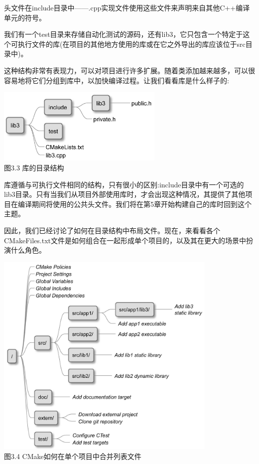 头文件在include目录中——.cpp实现文件使用这些文件来声明来自其他C++编译单元的符号。

我们有一个test目录来存储自动化测试的源码，还有lib3，它只包含一个特定于这个可执行文件的库(在项目的其他地方使用的库或在它之外导出的库应该位于src目录中)。

这种结构非常有表现力，可以对项目进行许多扩展。随着类添加越来越多，可以很容易地将它们分组到库中，以加快编译过程。让我们看看库是什么样子的:

\begin{center}
\includegraphics[width=0.6\textwidth]{content/1/chapter3/images/3.jpg}\\
图3.3 库的目录结构
\end{center}

库遵循与可执行文件相同的结构，只有很小的区别:include目录中有一个可选的lib3目录。只有当我们从项目外部使用库时，才会出现这种情况，其提供了其他项目在编译期间将使用的公共头文件。我们将在第5章开始构建自己的库时回到这个主题。

因此，我们已经讨论了如何在目录结构中布局文件。现在，来看看各个CMakeFiles.txt文件是如何组合在一起形成单个项目的，以及其在更大的场景中扮演什么角色。

\begin{center}
\includegraphics[width=0.8\textwidth]{content/1/chapter3/images/4.jpg}\\
图3.4 CMake如何在单个项目中合并列表文件
\end{center}

